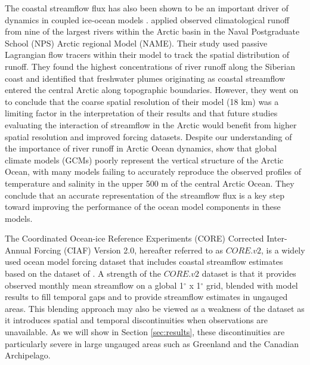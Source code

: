 \documentclass[jgrga, draft]{agutex}
\begin{document}
\begin{article}
The coastal streamflow flux has also been shown to be an important driver of dynamics in coupled ice-ocean models \citep[e.g.][]{Morison_2012,Lique_2015,Large_2009}.
\citet{Newton_2008} applied observed climatological runoff from nine of the largest rivers within the Arctic basin in the Naval Postgraduate School (NPS) Arctic regional Model (NAME).
Their study used passive Lagrangian flow tracers within their model to track the spatial distribution of runoff.
They found the highest concentrations of river runoff along the Siberian coast and identified that freshwater plumes originating as coastal streamflow entered the central Arctic along topographic boundaries.
However, they went on to conclude that the coarse spatial resolution of their model (18 km) was a limiting factor in the interpretation of their results and that future studies evaluating the interaction of streamflow in the Arctic would benefit from higher spatial resolution and improved forcing datasets.
Despite our understanding of the importance of river runoff in Arctic Ocean dynamics, \citet{Nummelin_2015} show that global climate models (GCMs) poorly represent the vertical structure of the Arctic Ocean, with many models failing to accurately reproduce the observed profiles of temperature and salinity in the upper 500 m of the central Arctic Ocean.
They conclude that an accurate representation of the streamflow flux is a key step toward improving the performance of the ocean model components in these models.

The Coordinated Ocean-ice Reference Experiments (CORE) Corrected Inter-Annual Forcing (CIAF) Version 2.0, hereafter referred to as $CORE.v2$, is a widely used ocean model forcing dataset that includes coastal streamflow estimates based on the dataset of \citet{Dai_2009}.
A strength of the $CORE.v2$ dataset is that it provides observed monthly mean streamflow on a global 1$^{\circ}$ x 1$^{\circ}$ grid, blended with model results to fill temporal gaps and to provide streamflow estimates in ungauged areas.
This blending approach may also be viewed as a weakness of the dataset as it introduces spatial and temporal discontinuities when observations are unavailable.
As we will show in Section \ref{sec:results}, these discontinuities are particularly severe in large ungauged areas such as Greenland and the Canadian Archipelago.


\end{article}
\end{document}
